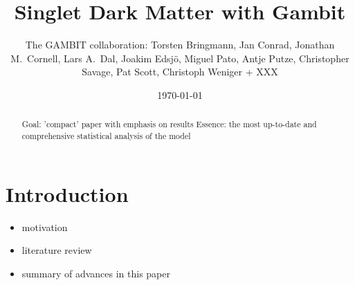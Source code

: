 \title{Singlet Dark Matter with Gambit}



\author{The GAMBIT collaboration: Torsten Bringmann, Jan Conrad, Jonathan M.~Cornell, Lars A.~Dal, Joakim Edsj\"o, Miguel Pato, Antje Putze, Christopher Savage, Pat Scott, Christoph Weniger + XXX
}




\date{\today}


\newcommand{\DB}{\mbox{\sf DarkBit}}
\newcommand{\GB}{\mbox{\sf GAMBIT}}


\maketitle

\begin{abstract}

Goal: 'compact' paper with emphasis on results
Essence: the most up-to-date and comprehensive statistical analysis of the model

\end{abstract}

\section{Introduction}
\label{intro}

\begin{itemize}
  \item motivation
  \item literature review
  \item summary of advances in this paper
\end{itemize}

